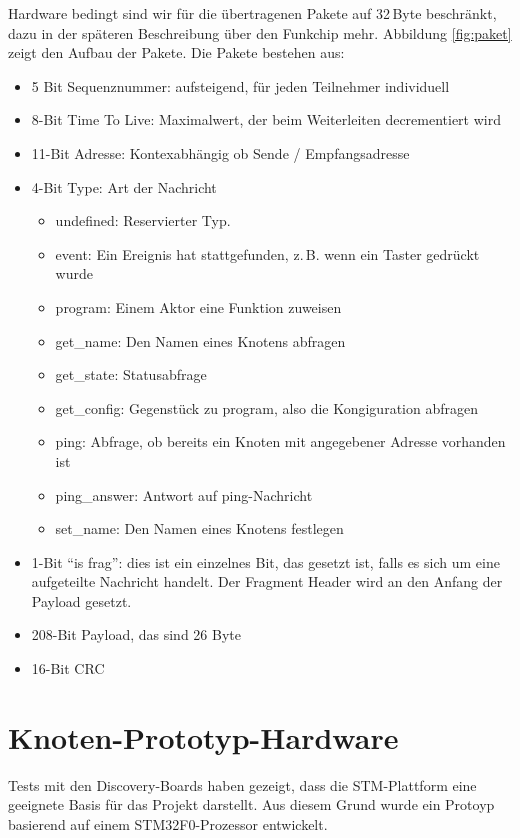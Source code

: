 \documentclass{IEEEtran}
\begin{document}
        Hardware bedingt sind wir für die übertragenen Pakete auf 32\,Byte 
        beschränkt, dazu in der späteren Beschreibung über den Funkchip mehr. 
        Abbildung \ref{fig:paket} zeigt den Aufbau der Pakete. Die Pakete 
        bestehen aus:
        \begin{itemize}
            \item 5 Bit Sequenznummer: aufsteigend, für jeden Teilnehmer individuell
            \item 8-Bit Time To Live: Maximalwert, der beim Weiterleiten decrementiert wird
            \item 11-Bit Adresse: Kontexabhängig ob Sende / Empfangsadresse
            \item 4-Bit Type: Art der Nachricht
            \begin{itemize}
                \item undefined: Reservierter Typ.
                \item event: Ein Ereignis hat stattgefunden, z.\,B. wenn ein Taster gedrückt wurde
                \item program: Einem Aktor eine Funktion zuweisen
                \item get\_name: Den Namen eines Knotens abfragen
                \item get\_state: Statusabfrage
                \item get\_config: Gegenstück zu program, also die Kongiguration abfragen
                \item ping: Abfrage, ob bereits ein Knoten mit angegebener Adresse vorhanden ist
                \item ping\_answer: Antwort auf ping-Nachricht
                \item set\_name: Den Namen eines Knotens festlegen
            \end{itemize}
            \item 1-Bit \enquote{is frag}: dies ist ein einzelnes Bit, das gesetzt ist, falls es sich um eine aufgeteilte Nachricht handelt. Der Fragment Header wird an den Anfang der Payload gesetzt.
            \item 208-Bit Payload, das sind 26 Byte
            \item 16-Bit CRC
        \end{itemize}

\section{Knoten-Prototyp-Hardware}
Tests mit den Discovery-Boards haben gezeigt, dass die STM-Plattform eine
geeignete Basis für das Projekt darstellt.
Aus diesem Grund wurde ein Protoyp basierend auf einem STM32F0-Prozessor entwickelt.
\end{document}
